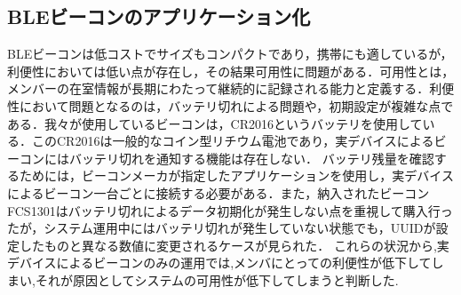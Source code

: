 


\subsection{ BLEビーコンのアプリケーション化}



BLEビーコンは低コストでサイズもコンパクトであり，携帯にも適しているが，利便性においては低い点が存在し，その結果可用性に問題がある．可用性とは，メンバーの在室情報が長期にわたって継続的に記録される能力と定義する．利便性において問題となるのは，バッテリ切れによる問題や，初期設定が複雑な点である．我々が使用しているビーコンは，CR2016というバッテリを使用している．このCR2016は一般的なコイン型リチウム電池であり，実デバイスによるビーコンにはバッテリ切れを通知する機能は存在しない．
バッテリ残量を確認するためには，ビーコンメーカが指定したアプリケーションを使用し，実デバイスによるビーコン一台ごとに接続する必要がある．また，納入されたビーコンFCS1301はバッテリ切れによるデータ初期化が発生しない点を重視して購入行ったが，システム運用中にはバッテリ切れが発生していない状態でも，UUIDが設定したものと異なる数値に変更されるケースが見られた．
これらの状況から,実デバイスによるビーコンのみの運用では,メンバにとっての利便性が低下してしまい,それが原因としてシステムの可用性が低下してしまうと判断した.



